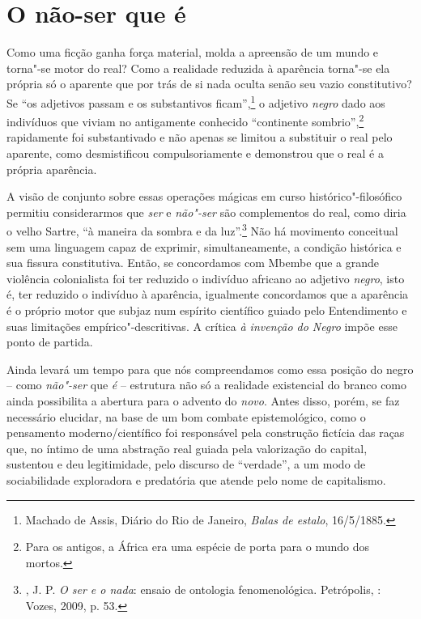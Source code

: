 \chapter{O não-ser que é}

Como uma ficção ganha força material, molda a apreensão de um mundo e
torna"-se motor do real? Como a realidade reduzida à aparência torna"-se
ela própria só o aparente que por trás de si nada oculta senão seu vazio
constitutivo? Se ``os adjetivos passam e os substantivos
ficam'',\footnote{Machado de Assis, Diário do Rio de Janeiro, \emph{Balas de estalo}, 16/5/1885.} o adjetivo \emph{negro} dado aos
indivíduos que viviam no antigamente conhecido ``continente
sombrio'',\footnote{Para os antigos, a África era uma espécie de porta
  para o mundo dos mortos.} rapidamente foi substantivado e
não apenas se limitou a substituir o real pelo aparente, como
desmistificou compulsoriamente e demonstrou que o real é a própria
aparência.

A visão de conjunto sobre essas operações mágicas em curso
histórico"-filosófico permitiu considerarmos que \emph{ser} e
\emph{não"-ser} são complementos do real, como diria o velho Sartre, ``à
maneira da sombra e da luz''.\footnote{, J. P. \emph{O ser e o
  nada}: ensaio de ontologia fenomenológica. Petrópolis, : Vozes,
  2009, p. 53.} Não há movimento conceitual sem uma linguagem capaz de
exprimir, simultaneamente, a condição histórica e sua fissura
constitutiva. Então, se concordamos com Mbembe que a grande violência
colonialista foi ter reduzido o indivíduo africano ao adjetivo
\emph{negro}, isto é, ter reduzido o indivíduo à aparência, igualmente
concordamos que a aparência é o próprio motor que subjaz num espírito
científico guiado pelo Entendimento e suas limitações
empírico"-descritivas. A crítica \emph{à invenção do Negro} impõe esse
ponto de partida.

Ainda levará um tempo para que nós compreendamos como essa posição do
negro -- como \emph{não"-ser} que \emph{é} -- estrutura não só a
realidade existencial do branco como ainda possibilita a abertura para o
advento do \emph{novo}. Antes disso, porém, se faz necessário elucidar,
na base de um bom combate epistemológico, como o pensamento
moderno/científico foi responsável pela construção fictícia das raças
que, no íntimo de uma abstração real guiada pela valorização do capital,
sustentou e deu legitimidade, pelo discurso de ``verdade'', a um modo de
sociabilidade exploradora e predatória que atende pelo nome de
capitalismo.

